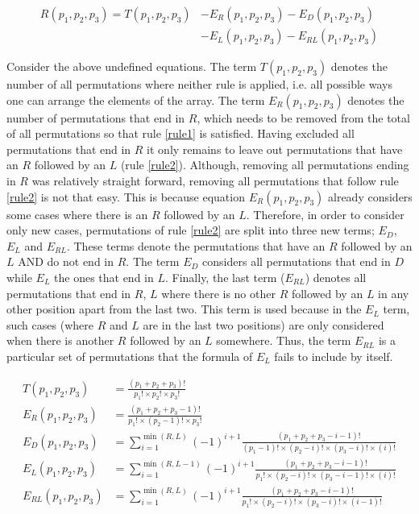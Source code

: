\begin{align} \label{eq:permutation formula}
    R(p_1, p_2, p_3) = T(p_1, p_2, p_3) & - E_R(p_1, p_2, p_3)
    - E_D(p_1, p_2, p_3) \nonumber \\
    & - E_L(p_1, p_2, p_3) - E_{RL}(p_1, p_2, p_3)
\end{align}

Consider the above undefined equations. 
The term \(T(p_1,p_2,p_3)\) denotes the number of all permutations where neither 
rule is applied, i.e. all possible ways one can arrange the elements of the array.
The term \(E_R(p_1,p_2,p_3)\) denotes the number of permutations that end in \(R\), 
which needs to be removed from the total of all permutations so that rule \ref{rule1} 
is satisfied.
Having excluded all permutations that end in \(R\) it only remains to leave out 
permutations that have an \(R\) followed by an \(L\) (rule \ref{rule2}).
Although, removing all permutations ending in \(R\) was relatively straight forward,
removing all permutations that follow rule \ref{rule2} is not that easy.
This is because equation \(E_R(p_1,p_2,p_3)\) already considers some cases where 
there is an \(R\) followed by an \(L\).
Therefore, in order to consider only new cases, permutations of rule \ref{rule2} 
are split into three new terms; \(E_D\), \(E_L\) and \(E_{RL}\).
These terms denote the permutations that have an \(R\) followed by an \(L\) AND 
do not end in \(R\).
The term \(E_D\) considers all permutations that end in \(D\) while \(E_L\) the 
ones that end in \(L\).
Finally, the last term (\(E_{RL}\)) denotes all permutations that end in \(R\), 
\(L\) where there is no other \(R\) followed by an \(L\) in any other position apart 
from the last two. 
This term is used because in the \(E_L\) term, such cases (where \(R\) and \(L\) 
are in the last two positions) are only considered when there is another \(R\) followed 
by an \(L\) somewhere.
Thus, the term \(E_{RL}\) is a particular set of permutations that the formula of 
\(E_L\) fails to include by itself.

\begin{align}
    T(p_1, p_2, p_3) &= \frac{(p_1 + p_2 + p_3)!}{p_1! \times p_2! \times p_3!} \\
    E_R(p_1, p_2, p_3) &= \frac{(p_1 + p_2 + p_3 - 1)!}
    {p_1! \times (p_2-1)! \times p_3!} \\
    E_D(p_1, p_2, p_3) &= \sum_{i=1}^{\min(R,L)} (-1)^{i+1} 
    \frac{(p_1 + p_2 + p_3 - i - 1)!}
    {(p_1 - 1)! \times (p_2 - i)! \times (p_3 - i)! \times (i)!} \\
    E_L(p_1, p_2, p_3) &= \sum_{i=1}^{\min(R,L-1)} (-1)^{i+1} 
    \frac{(p_1 + p_2 + p_3 - i - 1)!}
    {p_1! \times (p_2 - i)! \times (p_3 - i - 1)! \times (i)!} \\
    E_{RL}(p_1, p_2, p_3) &= \sum_{i=1}^{\min(R,L)} (-1)^{i+1} 
    \frac{(p_1 + p_2 + p_3 - i - 1)!}
    {p_1! \times (p_2 - i)! \times (p_3 - i)! \times (i - 1)!} 
\end{align}


